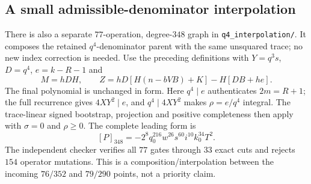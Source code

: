 \subsection{A small admissible-denominator interpolation}
There is also a separate $77$-operation, degree-$348$ graph in
\texttt{q4\_interpolation/}.  It composes the retained $q^4$-denominator
parent with the same unsquared trace; no new index correction is needed.
Use the preceding definitions with $Y=q^3s$, $D=q^4$, $e=k-R-1$ and
\[
 M=hDH,\qquad Z=hD[H(n-bVB)+K]-H[DB+he].
\]
The final polynomial is unchanged in form.  Here $q^4\mid e$ authenticates
$2m=R+1$; the full recurrence gives $4XY^2\mid e$, and
$q^4\mid4XY^2$ makes $\rho=e/q^4$ integral.  The trace-linear signed
bootstrap, projection and positive completeness then apply with $\sigma=0$
and $\rho\ge0$.  The complete leading form is
\[
 [P]_{348}=-2^8q_0^{216}w^{26}s^{60}i^{10}k_0^{34}T^2.
\]
The independent checker verifies all $77$ gates through $33$ exact cuts
and rejects $154$ operator mutations.  This is a composition/interpolation
between the incoming $76/352$ and $79/290$ points, not a priority claim.
